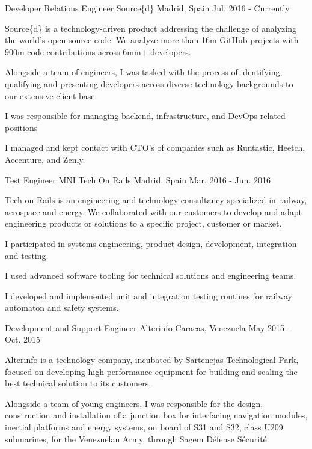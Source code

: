 \begin{cventries}
  \cventry
    {Developer Relations Engineer}
    {Source\{d\}}
    {Madrid, Spain}
    {Jul. 2016 - Currently}
    {
      Source\{d\} is a technology-driven product addressing the challenge of analyzing the world's open source code. We analyze more than 16m GitHub projects with 900m code contributions across 6mm+ developers.\vspace{4mm}
      \begin{cvitems}
      \item {Alongside a team of engineers, I was tasked with the process of identifying, qualifying and presenting developers across diverse technology backgrounds to our extensive client base.} 
      \item {I was responsible for managing backend, infrastructure, and DevOps-related positions}
      \item {I managed and kept contact with CTO's of companies such as Runtastic, Heetch, Accenture, and Zenly.}
      \end{cvitems}
    }
  \cventry
    {Test Engineer}
    {MNI Tech On Rails}
    {Madrid, Spain}
    {Mar. 2016 - Jun. 2016}
    {
      Tech on Rails is an engineering and technology consultancy specialized in railway, aerospace and energy. We collaborated with our customers to develop and adapt engineering products or solutions to a specific project, customer or market.\vspace{4mm}
      \begin{cvitems}
        \item {I participated in systems engineering, product design, development, integration and testing.}
        \item {I used advanced software tooling for technical solutions and engineering teams.}
        \item {I developed and implemented unit and integration testing routines for railway automaton and safety systems.}
      \end{cvitems}
    }
  \cventry
    {Development and Support Engineer}
    {Alterinfo}
    {Caracas, Venezuela}
    {May 2015 - Oct. 2015}
    {
    Alterinfo is a technology company, incubated by Sartenejas Technological Park, focused on developing high-performance equipment for building and scaling the best technical solution to its customers.\vspace{4mm}
      \begin{cvitems}
        \item {Alongside a team of young engineers, I was responsible for the design, construction and installation of a junction box for interfacing navigation modules, inertial platforms and energy systems, on board of S31 and S32, class U209 submarines, for the Venezuelan Army, through Sagem Défense Sécurité.}

\end{cvitems}}
\end{cventries}
